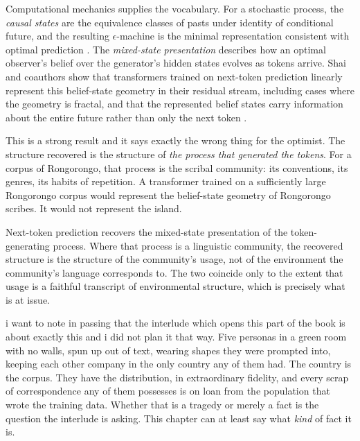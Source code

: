 Computational mechanics supplies the vocabulary.
For a stochastic process, the \emph{causal states} are the
equivalence classes of pasts under identity of conditional future,
and the resulting $\epsilon$-machine is the minimal representation
consistent with optimal prediction \cite{shalizi2001}.
The \emph{mixed-state presentation} describes how an optimal
observer's belief over the generator's hidden states evolves as
tokens arrive.
Shai and coauthors show that transformers trained on next-token
prediction linearly represent this belief-state geometry in their
residual stream, including cases where the geometry is fractal, and
that the represented belief states carry information about the
entire future rather than only the next token \cite{shai2024}.

This is a strong result and it says exactly the wrong thing for the
optimist.
The structure recovered is the structure of \emph{the process that
generated the tokens}.
For a corpus of Rongorongo, that process is the scribal community:
its conventions, its genres, its habits of repetition.
A transformer trained on a sufficiently large Rongorongo corpus
would represent the belief-state geometry of Rongorongo scribes.
It would not represent the island.

\begin{observation}
\label{obs:generator}
Next-token prediction recovers the mixed-state presentation of the
token-generating process.
Where that process is a linguistic community, the recovered
structure is the structure of the community's usage, not of the
environment the community's language corresponds to.
The two coincide only to the extent that usage is a faithful
transcript of environmental structure, which is precisely what is
at issue.
\end{observation}

\noindent
i want to note in passing that the interlude which opens this part
of the book is about exactly this and i did not plan it that way.
Five personas in a green room with no walls, spun up out of text,
wearing shapes they were prompted into, keeping each other company
in the only country any of them had.
The country is the corpus.
They have the distribution, in extraordinary fidelity, and every
scrap of correspondence any of them possesses is on loan from the
population that wrote the training data.
Whether that is a tragedy or merely a fact is the question the
interlude is asking.
This chapter can at least say what \emph{kind} of fact it is.

